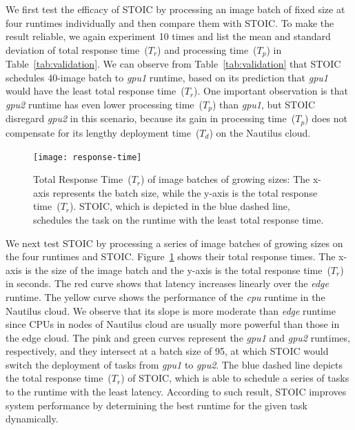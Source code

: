 We first test the efficacy of STOIC by processing an image batch of fixed size at four runtimes individually and then compare them with STOIC. To make the result reliable, we again experiment 10 times and list the mean and standard deviation of total response time~($T_r$) and processing time~($T_p$) in Table~\ref{tab:validation}. We can observe from Table~\ref{tab:validation} that STOIC schedules 40-image batch to \textit{gpu1} runtime, based on its prediction that  \textit{gpu1} would have the least total response time~($T_r$). One important observation is that \textit{gpu2} runtime has even lower processing time~($T_p$) than \textit{gpu1}, but STOIC disregard \textit{gpu2} in this scenario, because its gain in processing time~($T_p$) does not compensate for its lengthy deployment time~($T_d$) on the Nautilus cloud.

\begin{figure}[t] \centering 
\texttt{[image: response-time]}
\caption{Total Response Time~($T_r$) of image batches of growing sizes: The x-axis represents the batch size, while the y-axis is the total response time~($T_r$). STOIC, which is depicted in the blue dashed line, schedules the task on the runtime with the least total response time.  
\label{fig:response-time}}
\end{figure}

We next test STOIC by processing a series of image batches of growing sizes on the four runtimes and STOIC. Figure~\ref{fig:response-time} shows their total response times. The x-axis is the size of the image batch and the y-axis is the total response time~($T_r$) in seconds. The red curve shows that latency
increases linearly over the \textit{edge} runtime.  The yellow curve shows the performance of the \textit{cpu} runtime in the Nautilus cloud. 
We observe that its slope is more moderate than \textit{edge} runtime since CPUs in nodes of Nautilus cloud are usually more powerful than those in the edge cloud. The pink and green curves represent the \textit{gpu1} and \textit{gpu2} runtimes, respectively, and they intersect at a batch size of 95, at which STOIC would switch the deployment of tasks from \textit{gpu1} to \textit{gpu2}. The blue dashed line depicts the total response time~($T_r$) of STOIC, which is able to schedule a series of tasks to the runtime with the least latency. According to such result, STOIC improves system performance by determining the best runtime
for the given task dynamically.




